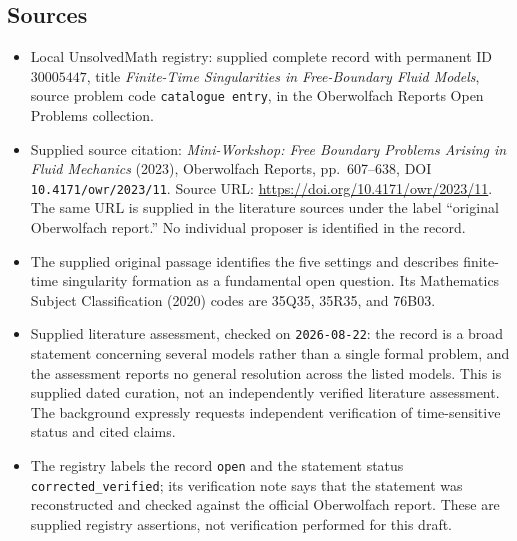 \documentclass[11pt]{article}
\begin{document}
\subsection{Sources}
\begin{itemize}
\item Local UnsolvedMath registry: supplied complete record with permanent ID \(30005447\), title \emph{Finite-Time Singularities in Free-Boundary Fluid Models}, source problem code \texttt{catalogue entry}, in the Oberwolfach Reports Open Problems collection.
\item Supplied source citation: \emph{Mini-Workshop: Free Boundary Problems Arising in Fluid Mechanics} (2023), Oberwolfach Reports, pp.~607--638, DOI \texttt{10.4171/owr/2023/11}. Source URL: \url{https://doi.org/10.4171/owr/2023/11}. The same URL is supplied in the literature sources under the label ``original Oberwolfach report.'' No individual proposer is identified in the record.
\item The supplied original passage identifies the five settings and describes finite-time singularity formation as a fundamental open question. Its Mathematics Subject Classification (2020) codes are 35Q35, 35R35, and 76B03.
\item Supplied literature assessment, checked on \texttt{2026-08-22}: the record is a broad statement concerning several models rather than a single formal problem, and the assessment reports no general resolution across the listed models. This is supplied dated curation, not an independently verified literature assessment. The background expressly requests independent verification of time-sensitive status and cited claims.
\item The registry labels the record \texttt{open} and the statement status \texttt{corrected\_verified}; its verification note says that the statement was reconstructed and checked against the official Oberwolfach report. These are supplied registry assertions, not verification performed for this draft.
\end{itemize}
\end{document}
